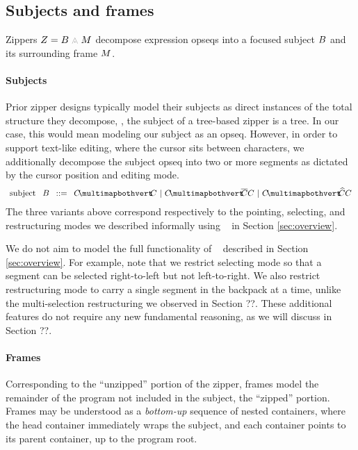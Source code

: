 \subsection{Subjects and frames} \label{sec:subjects-and-frames}
Zippers $\editState = \zipper{\subject}{\zframe}$ decompose
expression opseqs into a focused subject $B$ and
its surrounding frame $M$.

\paragraph{Subjects}
Prior zipper designs typically model their subjects
as direct instances of the total structure they decompose,
\eg, the subject of a tree-based zipper is a tree.
In our case, this would mean modeling our subject as
an opseq.
However, in order to support text-like editing,
where the cursor sits between characters, we
additionally decompose the subject opseq into
two or more segments as dictated by the cursor position
and editing mode.
\[\arraycolsep=4pt\begin{array}{rlrl}
  \text{subject} & \subject & ::= &
  \pointing{\selection}{\selection} ~\vert~
  \selecting{\selection}{\selection}{\selection} ~\vert~
  \restructuring{\selection}{\selection}{\selection}
\end{array}\]
The three variants above correspond respectively to the pointing,
selecting, and restructuring modes we described
informally using \tylr~ in Section \ref{sec:overview}.

We do not aim to model the full functionality of \tylr~
described in Section \ref{sec:overview}.
For example, note that we restrict selecting mode so that
a segment can be selected right-to-left but not left-to-right.
We also restrict restructuring mode to carry a single
segment in the backpack at a time, unlike the multi-selection
restructuring we observed in Section ??.
These additional features do not require any new fundamental
reasoning, as we will discuss in Section ??.

% 

\paragraph{Frames}
Corresponding to the ``unzipped'' portion of the zipper,
frames model the remainder of the program not included
in the subject, the ``zipped'' portion.
Frames may be understood as a \emph{bottom-up} sequence of
nested containers, where the head container immediately
wraps the subject, and each container points to its
parent container, up to the program root.

